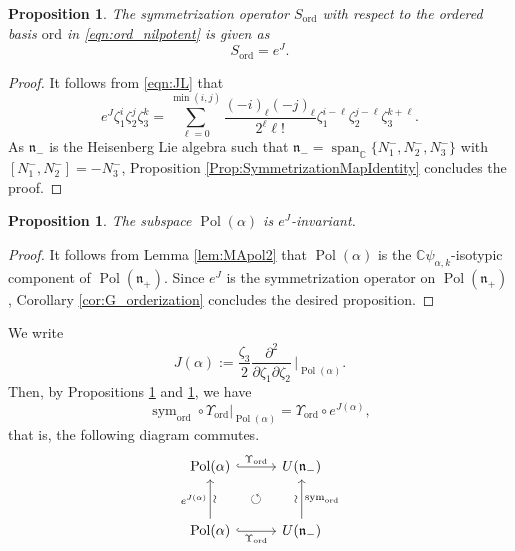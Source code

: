 \documentclass[a4paper,11pt,reqno]{amsart}
\newcommand{\frakn}{\mathfrak{n}}
\newcommand{\CC}{\mathbb{C}}
\newcommand{\0}{{\bf 0}}
\newcommand{\C}{\mathbb{C}}
\newcommand{\1}{{\bf 1}}
\DeclareMathOperator{\Span}{span}
\DeclareMathOperator{\Pol}{Pol}
\newcommand{\ord}{{\mathrm{ord}}}
\DeclareMathOperator{\sym}{sym}
\theoremstyle{plain}
\newtheorem{proposition}[equation]{Proposition}
\theoremstyle{definition}
\numberwithin{equation}{section}
\theoremstyle{definition}
\begin{document}
\begin{proposition}\label{prop:eJU}
The symmetrization operator $S_\ord$ with respect to the ordered basis 
$\ord$ in \eqref{eqn:ord_nilpotent} is given as 
\begin{equation*}
S_{\ord}=e^{J}.
\end{equation*}
\end{proposition}

\begin{proof}
It follows from \eqref{eqn:JL} that
\begin{equation}\label{eqn:ijk}
e^{J}\zeta_1^i\zeta_2^j\zeta_3^k 
=\sum_{\ell=0}^{\min(i,j)} 
\frac{(-i)_\ell (-j)_\ell}{2^\ell \ell!}\zeta_1^{i-\ell}\zeta_2^{j-\ell}\zeta_3^{k+\ell}.
\end{equation}
As $\frakn_-$ is the Heisenberg Lie algebra such that
$\frakn_-=\Span_\CC\{N_1^-, N_2^-, N_3^-\}$
 with $[N_1^-, N_2^-]=-N_3^-$, 
Proposition \ref{Prop:SymmetrizationMapIdentity} concludes the proof.
\end{proof}

\begin{proposition}\label{prop:symU}
The subspace $\Pol(\alpha)$ is $e^{J}$-invariant.
\end{proposition}

\begin{proof}
It follows from Lemma \ref{lem:MApol2} that
$\Pol(\alpha)$ is the $\C \psi_{\alpha,k}$-isotypic 
component of $\Pol(\frakn_+)$.
Since $e^J$ is the symmetrization operator on $\Pol(\frakn_+)$,
Corollary \ref{cor:G_orderization} concludes the desired proposition.
\end{proof}

We write
\begin{equation*}
J(\alpha)
:=\frac{\zeta_3}{2}\frac{\partial^2}{\partial\zeta_1\partial\zeta_2}\, \bigg\vert_{\Pol(\alpha)}.
\end{equation*}
Then, by Propositions \ref{prop:eJU} and \ref{prop:symU}, we have 
\begin{equation}\label{eqn:symU}
\sym_{\ord} \circ \Upsilon_{\ord}\vert_{\Pol(\alpha)} 
= \Upsilon_{\ord} \circ e^{J(\alpha)},
\end{equation}
that is, the following diagram commutes.
\begin{equation}\label{eqn:diagram0}
\begin{tikzcd}[row sep=1cm, column sep=1cm]
\Pol(\alpha)
\arrow[r, "\Upsilon_{\ord}", hook]
& 
U(\frakn_-)
\arrow[dl, pos=0.5, phantom, "\circlearrowleft"]
\\
\Pol(\alpha)
\arrow[u, "e^{J(\alpha)}","\sim"' sloped]
\arrow[r, "\Upsilon_{\ord}"', hook]
& U(\frakn_-)
\arrow[u, "\sim" sloped, "\sym_{\ord}"']
\end{tikzcd}
\end{equation}
\end{document}
